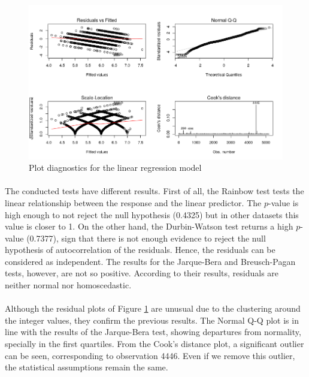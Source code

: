 \documentclass[10pt]{article}
\begin{document}
\begin{figure}[H]
	\centering
	\includegraphics[width=5in]{figures/qqplot.png}
	\caption{Plot diagnostics for the linear regression model} 
	\label{figure:qqplot}
\end{figure}

\paragraph*{}
The conducted tests have different results. First of all, the Rainbow test tests the linear relationship between the response and the linear predictor. The $p$-value is high enough to not reject the null hypothesis (0.4325) but in other datasets this value is closer to 1. On the other hand, the Durbin-Watson test returns a high $p$-value (0.7377), sign that there is not enough evidence to reject the null hypothesis of autocorrelation of the residuals. Hence, the residuals can be considered as independent. The results for the Jarque-Bera and Breusch-Pagan tests, however, are not so positive. According to their results, residuals are neither normal nor homoscedastic.

\paragraph*{}
Although the residual plots of Figure \ref{figure:qqplot} are unusual due to the clustering around the integer values, they confirm the previous results. The Normal Q-Q plot is in line with the results of the Jarque-Bera test, showing departures from normality, specially in the first quartiles. From the Cook's distance plot, a significant outlier can be seen, corresponding to observation 4446. Even if we remove this outlier, the statistical assumptions remain the same.
\end{document}

